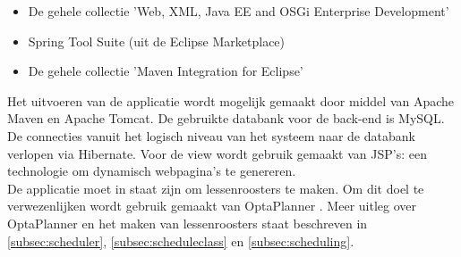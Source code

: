 \begin{itemize}
	\item De gehele collectie 'Web, XML, Java EE and OSGi Enterprise Development'	
	\item Spring Tool Suite (uit de Eclipse Marketplace)
	\item De gehele collectie 'Maven Integration for Eclipse'
\end{itemize}
\noindent
Het uitvoeren van de applicatie wordt mogelijk gemaakt door middel van Apache Maven\cite{Maven} en Apache Tomcat\cite{Tomcat}.
De gebruikte databank voor de back-end is MySQL.
De connecties vanuit het logisch niveau van het systeem naar de databank verlopen via Hibernate\cite{hibernate}. 
Voor de view wordt gebruik gemaakt van JSP's: een technologie om dynamisch webpagina's te genereren.\\

De applicatie moet in staat zijn om lessenroosters te maken.
Om dit doel te verwezenlijken wordt gebruik gemaakt van OptaPlanner \cite{optaplanner}. 
Meer uitleg over OptaPlanner en het maken van lessenroosters staat beschreven in \ref{subsec:scheduler}, \ref{subsec:scheduleclass} en \ref{subsec:scheduling}.